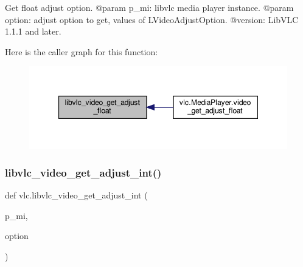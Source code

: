 \begin{DoxyVerb}Get float adjust option.
@param p_mi: libvlc media player instance.
@param option: adjust option to get, values of L{VideoAdjustOption}.
@version: LibVLC 1.1.1 and later.
\end{DoxyVerb}
 Here is the caller graph for this function\+:
\nopagebreak
\begin{figure}[H]
\begin{center}
\leavevmode
\includegraphics[width=347pt]{namespacevlc_af6b4ba880f091b003978517c9ef566cb_icgraph}
\end{center}
\end{figure}
\mbox{\label{namespacevlc_ab0a3bb5f8036e686a3dedc3703aa7c06}} 
\subsubsection{\texorpdfstring{libvlc\+\_\+video\+\_\+get\+\_\+adjust\+\_\+int()}{libvlc\_video\_get\_adjust\_int()}}
{\footnotesize\ttfamily def vlc.\+libvlc\+\_\+video\+\_\+get\+\_\+adjust\+\_\+int (\begin{DoxyParamCaption}\item[{}]{p\+\_\+mi,  }\item[{}]{option }\end{DoxyParamCaption})}

